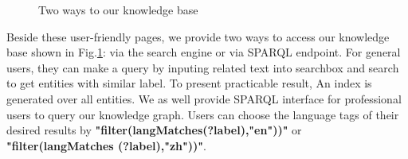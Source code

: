 \documentclass[runningheads,a4paper]{llncs}
\begin{document}
\begin{figure}
\centering
{}
\hspace{0.01cm}
\caption{Two ways to our knowledge base}
\label{fig:access}
\end{figure}

Beside these user-friendly pages, we provide two ways to access our knowledge base shown in Fig.\ref{fig:access}: via the search engine or via SPARQL endpoint. For general users, they can make a query by inputing related text into searchbox and search to get entities with similar label. To present practicable result, An index is generated over all entities. We as well provide SPARQL interface for professional users to query our knowledge graph. Users can choose the language tags of their desired results by \textbf{"filter(langMatches(?label),"en"))"} or \textbf{"filter(langMatches (?label),"zh"))"}.%
\end{document}
